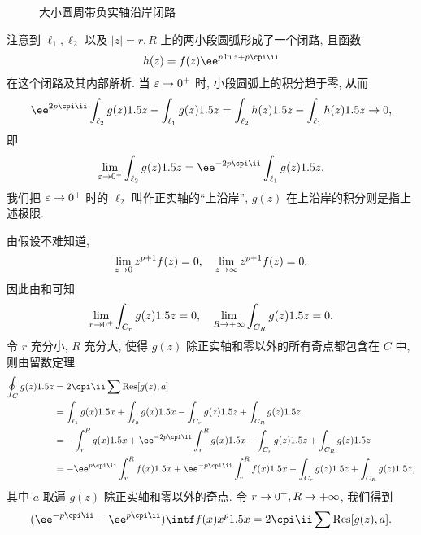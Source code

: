 \begin{figure}[!htb]
  \centering
  \caption{大小圆周带负实轴沿岸闭路}
  \label{fig:large-small-circle-negative-side}
\end{figure}

注意到 $\ell_1,\ell_2$ 以及 $|z|=r,R$ 上的两小段圆弧形成了一个闭路, 且函数
\[
  h(z)=f(z)\ee^{p\ln z+p\cpi\ii}
\]
在这个闭路及其内部解析.
当 $\varepsilon\rightarrow0^+$ 时, 小段圆弧上的积分趋于零, 从而
\[
  \ee^{2p\cpi\ii}\int_{\ell_2} g(z)\d z-\int_{\ell_1} g(z)\d z
  =\int_{\ell_2} h(z)\d z-\int_{\ell_1} h(z)\d z
  \ra 0,
\]
即
\[
  \lim_{\varepsilon\ra 0^+}\int_{\ell_2} g(z)\d z
  =\ee^{-2p\cpi\ii}\int_{\ell_1} g(z)\d z.
\]
我们把 $\varepsilon\rightarrow 0^+$ 时的 $\ell_2$ 叫作正实轴的``上沿岸'', $g(z)$ 在上沿岸的积分则是指上述极限.

由假设不难知道,
\[
  \lim_{z\rightarrow 0} z^{p+1}f(z)=0,\quad
  \lim_{z\rightarrow \infty} z^{p+1}f(z)=0.
\]
因此由\thmsa 和\thmSA 可知
\[
  \lim_{r\rightarrow0^+}\int_{C_r} g(z)1.5 z=0,\quad
  \lim_{R\rightarrow+\infty}\int_{C_R} g(z)1.5 z=0.
\]
令 $r$ 充分小, $R$ 充分大, 使得 $g(z)$ 除正实轴和零以外的所有奇点都包含在 $C$ 中, 则由留数定理
\begin{align*}
   \oint_C g(z)\d z&
  =2\cpi\ii\sum \Res[g(z),a]\\&
  =\int_{\ell_1} g(x)\d x
    +\int_{\ell_2} g(x)\d x
    -\int_{C_r}g(z)\d z
    +\int_{C_R}g(z)\d z\\&
  =-\int_r^R g(x)\d x
    +\ee^{-2p\cpi\ii}\int_r^R g(x)\d x
    -\int_{C_r}g(z)\d z
    +\int_{C_R}g(z)\d z\\&
  =-\ee^{p\cpi\ii}\int_r^R f(x)\d x
    +\ee^{-p\cpi\ii}\int_r^R f(x)\d x
    -\int_{C_r}g(z)\d z
    +\int_{C_R}g(z)\d z,
\end{align*}
其中 $a$ 取遍 $g(z)$ 除正实轴和零以外的奇点.
令 $r\rightarrow0^+,R\rightarrow +\infty$, 我们得到
\[
   (\ee^{-p\cpi\ii}-\ee^{p\cpi\ii})\intf f(x)x^p\d x
  =2\cpi\ii\sum \Res[g(z),a].
\]

